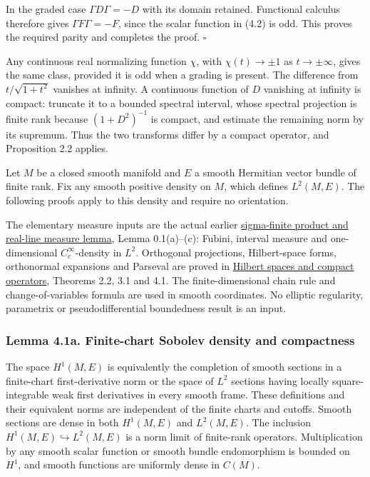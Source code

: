\documentclass[
  11pt,
]{article}
\begin{document}
In the graded case \(\Gamma D\Gamma=-D\) with its domain retained.
Functional calculus therefore gives \(\Gamma F\Gamma=-F\), since the
scalar function in (4.2) is odd. This proves the required parity and
completes the proof. \(\square\)

Any continuous real normalizing function \(\chi\), with
\(\chi(t)\to\pm1\) as \(t\to\pm\infty\), gives the same class, provided
it is odd when a grading is present. The difference from
\(t/\sqrt{1+t^2}\) vanishes at infinity. A continuous function of \(D\)
vanishing at infinity is compact: truncate it to a bounded spectral
interval, whose spectral projection is finite rank because
\((1+D^2)^{-1}\) is compact, and estimate the remaining norm by its
supremum. Thus the two transforms differ by a compact operator, and
Proposition 2.2 applies.

Let \(M\) be a closed smooth manifold and \(E\) a smooth Hermitian
vector bundle of finite rank. Fix any smooth positive density on \(M\),
which defines \(L^2(M,E)\). The following proofs apply to this density
and require no orientation.

The elementary measure inputs are the actual earlier
\href{https://kokunoyumeto.github.io/open-math-courses/courses/foundations-of-von-neumann-algebras/compact-and-trace-class-operators-the-predual-of-b-h-and-the-operator-topologies.html\#oa-fnd-lt-17}{sigma-finite
product and real-line measure lemma}, Lemma 0.1(a)--(c): Fubini,
interval measure and one-dimensional \(C_c^\infty\)-density in \(L^2\).
Orthogonal projections, Hilbert-space forms, orthonormal expansions and
Parseval are proved in
\href{https://kokunoyumeto.github.io/open-math-courses/courses/foundations-of-von-neumann-algebras/hilbert-spaces-and-compact-operators.html}{Hilbert
spaces and compact operators}, Theorems 2.2, 3.1 and 4.1. The
finite-dimensional chain rule and change-of-variables formula are used
in smooth coordinates. No elliptic regularity, parametrix or
pseudodifferential boundedness result is an input.

\subsubsection{Lemma 4.1a. Finite-chart Sobolev density and
compactness}\label{lemma-4.1a.-finite-chart-sobolev-density-and-compactness}

The space \(H^1(M,E)\) is equivalently the completion of smooth sections
in a finite-chart first-derivative norm or the space of \(L^2\) sections
having locally square-integrable weak first derivatives in every smooth
frame. These definitions and their equivalent norms are independent of
the finite charts and cutoffs. Smooth sections are dense in both
\(H^1(M,E)\) and \(L^2(M,E)\). The inclusion
\(H^1(M,E)\hookrightarrow L^2(M,E)\) is a norm limit of finite-rank
operators. Multiplication by any smooth scalar function or smooth bundle
endomorphism is bounded on \(H^1\), and smooth functions are uniformly
dense in \(C(M)\).
\end{document}
